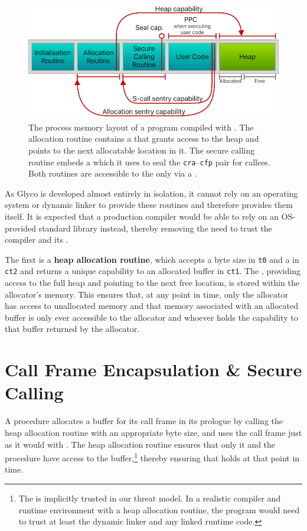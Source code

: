 \documentclass[main.tex]{subfiles}
\begin{document}
\begin{figure}
	\begin{center}
		\includegraphics{Images/GHSCC Process Memory.pdf}
	\end{center}
	\caption{The process memory layout of a program compiled with . The allocation routine contains a  that grants access to the heap and points to the next allocatable location in it. The secure calling routine embeds a  which it uses to seal the \texttt{cra}–\texttt{cfp} pair for callees. Both routines are accessible to the  only via a .}
	\label{fig:procmem}
\end{figure}

As Glyco is developed almost entirely in isolation, it cannot rely on an operating system or dynamic linker to provide these routines and therefore provides them itself. It is expected that a production compiler would be able to rely on an OS-provided standard library instead, thereby removing the need to trust the compiler and its .

The first  is a \textbf{heap allocation routine}, which accepts a byte size in \texttt{t0} and a  in \texttt{ct2} and returns a unique capability to an allocated buffer in \texttt{ct1}. The , providing access to the full heap and pointing to the next free location, is stored within the allocator's memory. This ensures that, at any point in time, only the allocator has access to unallocated memory and that memory associated with an allocated buffer is only ever accessible to the allocator and whoever holds the capability to that buffer returned by the allocator.

\section{Call Frame Encapsulation \& Secure Calling} \label{sct:ghscc}
A procedure allocates a buffer for its call frame in its prologue by calling the heap allocation routine with an appropriate byte size, and uses the call frame just as it would with . The heap allocation routine ensures that only it and the procedure have access to the buffer,\footnote{The  is implicitly trusted in our threat model. In a realistic compiler and runtime environment with a heap allocation routine, the program would need to trust at least the dynamic linker and any linked runtime code.} thereby ensuring that  holds at that point in time.
\end{document}
